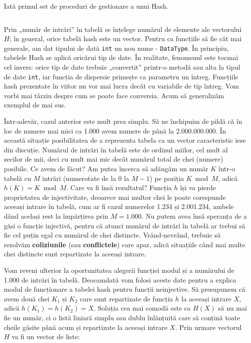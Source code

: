 Iată primul set de proceduri de gestionare a unui Hash.

\inputminted{c}{src/chapter4-2.c}

Prin „număr de intrări” în tabelă se înțelege numărul de elemente ale
vectorului $H$; în general, orice tabelă hash este un vector. Pentru ca
funcțiile să fie cât mai generale, am dat tipului de dată {\tt int} un nou
nume - {\tt DataType}. În principiu, tabelele Hash se aplică oricărui tip de
date. În realitate, fenomenul este tocmai cel invers: orice tip de date
trebuie „convertit” printr-o metodă sau alta la tipul de date {\tt int}, iar
funcția de dispersie primește ca parametru un întreg. Funcțiile hash
prezentate în viitor nu vor mai lucra decât cu variabile de tip întreg. Vom
vorbi mai târziu despre cum se poate face conversia. Acum să generalizăm
exemplul de mai sus.

Într-adevăr, cazul anterior este mult prea simplu. Să ne închipuim de pildă că
în loc de numere mai mici ca 1.000 avem numere de până la 2.000.000.000. În
această situație posibilitatea de a reprezenta tabela ca un vector
caracteristic iese din discuție. Numărul de intrări în tabelă este de ordinul
miilor, cel mult al zecilor de mii, deci cu mult mai mic decât numărul total
de chei (numere) posibile. Ce avem de făcut? Am putea încerca să adăugăm un
număr $K$ într-o tabelă cu $M$ intrări (numerotate de la 0 la $M-1$) pe
poziția $K \bmod M$, adică $h(K)=K \bmod M$. Care va fi însă rezultatul?
Funcția $h$ își va pierde proprietatea de injectivitate, deoarece mai multor
chei le poate corespunde aceeași intrare în tabelă, cum ar fi cazul numerelor
1.234 și 2.001.234, ambele dând același rest la împărțirea prin $M=1.000$. Nu
putem avea însă speranța de a găsi o funcție injectivă, pentru că atunci
numărul de intrări în tabelă ar trebui să fie cel puțin egal cu numărul de
chei distincte. Vrând-nevrând, trebuie să rezolvăm {\bf coliziunile} (sau {\bf
  conflictele}) care apar, adică situațiile când mai multe chei distincte sunt
repartizate la aceeași intrare.

Vom reveni ulterior la oportunitatea alegerii funcției modul și a numărului de
1.000 de intrări în tabelă. Deocamdată vom folosi aceste date pentru a explica
modul de funcționare a tabelei hash pentru funcții neinjective. Să presupunem
că avem două chei $K_1$ și $K_2$ care sunt repartizate de funcția $h$ la
aceeași intrare $X$, adică $h(K_1) = h(K_2) = X$. Soluția cea mai comodă este
ca $H(X)$ să nu mai fie un număr, ci o listă liniară simplu sau dublu
înlănțuită care să conțină toate cheile găsite până acum și repartizate la
aceeași intrare $X$. Prin urmare vectorul $H$ va fi un vector de liste:

